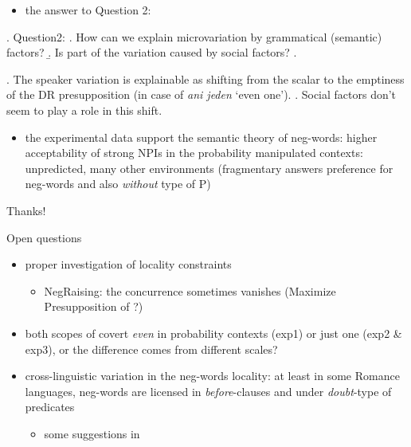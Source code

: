\documentclass[
  ignorenonframetext,
]{beamer}
\providecommand{\tightlist}{%
  \setlength{\itemsep}{0pt}\setlength{\parskip}{0pt}}
\begin{document}
\begin{frame}
\begin{itemize}
\tightlist
\item
  the answer to Question 2:
\end{itemize}

\ex. Question2: \a. How can we explain microvariation by grammatical
(semantic) factors? \b. Is part of the variation caused by social
factors? \z.

\ex. The speaker variation is explainable as shifting from the scalar to
the emptiness of the DR presupposition (in case of \emph{ani jeden}
`even one'). \a. Social factors don't seem to play a role in this shift.

\begin{itemize}
\tightlist
\item
  the experimental data support the semantic theory of neg-words: higher
  acceptability of strong NPIs in the probability manipulated contexts:
  unpredicted, many other environments (fragmentary answers preference
  for neg-words and also \emph{without} type of P)
\end{itemize}
\end{frame}

\begin{frame}
\begin{center}
\Huge Thanks!
\end{center}

\normalsize
\end{frame}

\begin{frame}
\begin{block}{Open questions}
\protect\hypertarget{open-questions}{}
\begin{itemize}
\tightlist
\item
  proper investigation of locality constraints

  \begin{itemize}
  \tightlist
  \item
    NegRaising: the concurrence sometimes vanishes (Maximize
    Presupposition of \citealt{heim1991articles}?)
  \end{itemize}
\item
  both scopes of covert \emph{even} in probability contexts (exp1) or
  just one (exp2 \& exp3), or the difference comes from different
  scales?
\item
  cross-linguistic variation in the neg-words locality: at least in some
  Romance languages, neg-words are licensed in \emph{before}-clauses and
  under \emph{doubt}-type of predicates

  \begin{itemize}
  \tightlist
  \item
    some suggestions in \cite{kuhn2022dynamics}
  \end{itemize}
\end{itemize}
\end{block}
\end{frame}
\end{document}
